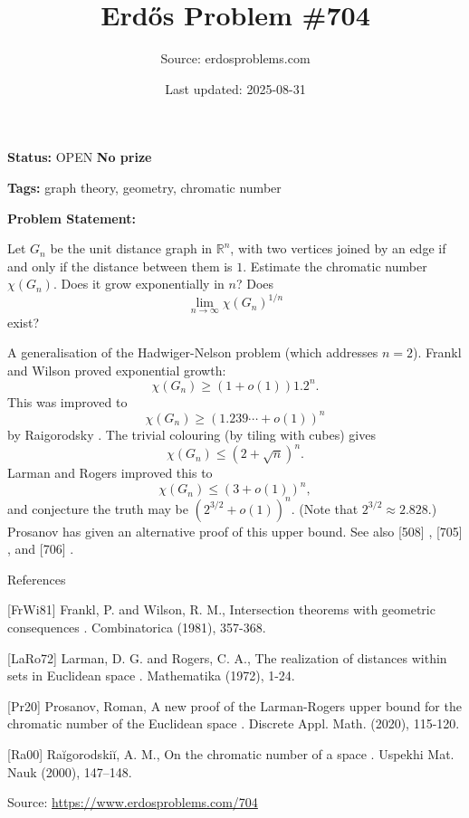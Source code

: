 \documentclass{article}
\title{Erd\H{o}s Problem \#704}
\date{Last updated: 2025-08-31}
\author{Source: erdosproblems.com}
\begin{document}
\maketitle

\noindent\textbf{Status:} OPEN \quad \textbf{No prize}

\noindent\textbf{Tags:} graph theory, geometry, chromatic number

\medskip

\noindent\textbf{Problem Statement:}

Let $G_n$ be the unit distance graph in $\mathbb{R}^n$, with two vertices joined by an edge if and only if the distance between them is $1$. Estimate the chromatic number $\chi(G_n)$. Does it grow exponentially in $n$? Does\[\lim_{n\to \infty}\chi(G_n)^{1/n}\]exist?




A generalisation of the Hadwiger-Nelson problem (which addresses $n=2$). Frankl and Wilson \cite{FrWi81} proved exponential growth:\[\chi(G_n) \geq (1+o(1))1.2^n.\]This was improved to\[\chi(G_n)\geq (1.239\cdots+o(1))^n\]by Raigorodsky \cite{Ra00}. The trivial colouring (by tiling with cubes) gives\[\chi(G_n) \leq (2+\sqrt{n})^n.\]Larman and Rogers \cite{LaRo72} improved this to\[\chi(G_n) \leq (3+o(1))^n,\]and conjecture the truth may be $(2^{3/2}+o(1))^n$. (Note that $2^{3/2}\approx 2.828$.) Prosanov \cite{Pr20} has given an alternative proof of this upper bound. See also [508] , [705] , and [706] .




References

[FrWi81] Frankl, P. and Wilson, R. M., Intersection theorems with geometric consequences . Combinatorica (1981), 357-368.

[LaRo72] Larman, D. G. and Rogers, C. A., The realization of distances within sets in Euclidean space . Mathematika (1972), 1-24.

[Pr20] Prosanov, Roman, A new proof of the Larman-Rogers upper bound for the chromatic number of the Euclidean space . Discrete Appl. Math. (2020), 115-120.

[Ra00] Ra\u igorodski\u i, A. M., On the chromatic number of a space . Uspekhi Mat. Nauk (2000), 147--148.


\bigskip
\noindent\small{Source: \url{https://www.erdosproblems.com/704}}
\end{document}
